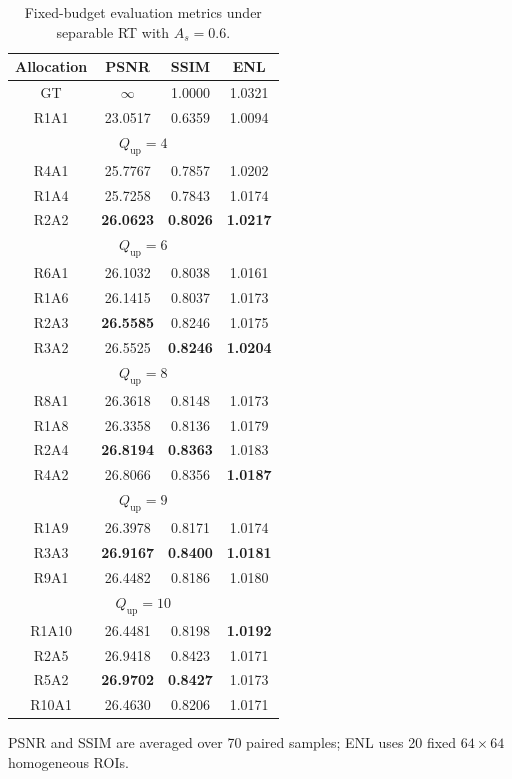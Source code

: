 \documentclass[conference]{IEEEtran}
\begin{document}
\begin{table}[t]
\caption{Fixed-budget evaluation metrics under separable RT with $A_s=0.6$.}
\label{tab:evaluation_indexes}
\centering
\scriptsize
\renewcommand{\arraystretch}{0.84}
\setlength{\tabcolsep}{8pt}
\begin{tabular}{c c c c}
\hline
Allocation & PSNR & SSIM & ENL \\
\hline
GT & $\infty$ & 1.0000 & 1.0321 \\
R1A1 & 23.0517 & 0.6359 & 1.0094 \\
\hline
\multicolumn{4}{c}{$Q_{\mathrm{up}}=4$} \\
\hline
R4A1 & 25.7767 & 0.7857 & 1.0202 \\
R1A4 & 25.7258 & 0.7843 & 1.0174 \\
R2A2 & \textbf{26.0623} & \textbf{0.8026} & \textbf{1.0217} \\
\hline
\multicolumn{4}{c}{$Q_{\mathrm{up}}=6$} \\
\hline
R6A1 & 26.1032 & 0.8038 & 1.0161 \\
R1A6 & 26.1415 & 0.8037 & 1.0173 \\
R2A3 & \textbf{26.5585} & 0.8246 & 1.0175 \\
R3A2 & 26.5525 & \textbf{0.8246} & \textbf{1.0204} \\
\hline
\multicolumn{4}{c}{$Q_{\mathrm{up}}=8$} \\
\hline
R8A1 & 26.3618 & 0.8148 & 1.0173 \\
R1A8 & 26.3358 & 0.8136 & 1.0179 \\
R2A4 & \textbf{26.8194} & \textbf{0.8363} & 1.0183 \\
R4A2 & 26.8066 & 0.8356 & \textbf{1.0187} \\
\hline
\multicolumn{4}{c}{$Q_{\mathrm{up}}=9$} \\
\hline
R1A9 & 26.3978 & 0.8171 & 1.0174 \\
R3A3 & \textbf{26.9167} & \textbf{0.8400} & \textbf{1.0181} \\
R9A1 & 26.4482 & 0.8186 & 1.0180 \\
\hline
\multicolumn{4}{c}{$Q_{\mathrm{up}}=10$} \\
\hline
R1A10 & 26.4481 & 0.8198 & \textbf{1.0192} \\
R2A5 & 26.9418 & 0.8423 & 1.0171 \\
R5A2 & \textbf{26.9702} & \textbf{0.8427} & 1.0173 \\
R10A1 & 26.4630 & 0.8206 & 1.0171 \\
\hline
\end{tabular}
\vspace{2pt}

\parbox{0.96\linewidth}{\footnotesize PSNR and SSIM are averaged over 70 paired samples; ENL uses 20 fixed $64\times64$ homogeneous ROIs.}
\end{table}
\end{document}
